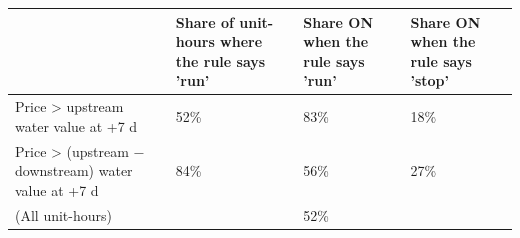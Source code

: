 \begin{tabular}{p{4.6cm}p{2.8cm}p{2.8cm}p{2.8cm}}
\toprule
\textbf{} & \textbf{Share of unit-hours where the rule says 'run'} & \textbf{Share ON when the rule says 'run'} & \textbf{Share ON when the rule says 'stop'} \\
\midrule
Price > upstream water value at +7 d & 52\% & 83\% & 18\% \\
Price > (upstream − downstream) water value at +7 d & 84\% & 56\% & 27\% \\
(All unit-hours) &  & 52\% &  \\
\bottomrule
\end{tabular}
